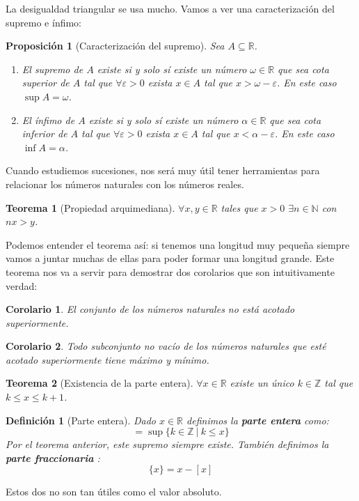 \documentclass{article}
\newtheorem{theorem}{Teorema}
\newtheorem{prop}{Proposición}
\newtheorem{cor}{Corolario}
\newtheorem{define}{Definición}
\begin{document}
La desigualdad triangular se usa mucho. Vamos a ver una caracterización del supremo e ínfimo:
\begin{prop}[Caracterización del supremo]
Sea $A\subseteq \mathbb{R}$.
\begin{enumerate}
\item
El supremo de $A$ existe si y solo sí existe un número $\omega \in \mathbb{R}$ que sea cota superior de $A$ tal que $\forall \varepsilon > 0$ exista $x \in A$ tal que $x > \omega - \varepsilon$. En este caso $\sup A = \omega$.

\item
El ínfimo de $A$ existe si y solo sí existe un número $\alpha \in \mathbb{R}$ que sea cota inferior de $A$ tal que $\forall \varepsilon > 0$ exista $x \in A$ tal que $x < \alpha - \varepsilon$. En este caso $\inf A = \alpha$.
\end{enumerate}
\end{prop}


Cuando estudiemos sucesiones, nos será muy útil tener herramientas para relacionar los números naturales con los números reales.


\begin{theorem}[Propiedad arquimediana]
$\forall x,y \in \mathbb{R}$ tales que $x>0$ $\exists n \in \mathbb{N}$ con $nx>y$.
\end{theorem}
Podemos entender el teorema así: si tenemos una longitud muy pequeña siempre vamos a juntar muchas de ellas para poder formar una longitud grande. Este teorema nos va a servir para demostrar dos corolarios que son intuitivamente verdad:
\begin{cor}
El conjunto de los números naturales no está acotado superiormente.
\end{cor}
\begin{cor}
Todo subconjunto no vacío de los números naturales que esté acotado superiormente tiene máximo y mínimo.
\end{cor}

\begin{theorem}[Existencia de la parte entera]
$\forall x \in \mathbb{R}$ existe un único $k \in \mathbb{Z}$ tal que $k\leq x\leq k+1$.
\end{theorem}
\begin{define}[Parte entera]
Dado $x \in \mathbb{R}$ definimos la \textbf{parte entera} como:
\begin{equation}
[x] = \sup \{k\in \mathbb{Z}\ |\ k\leq x\}
\end{equation}
Por el teorema anterior, este supremo siempre existe. También definimos la \textbf{parte fraccionaria} :
\begin{equation}
\{x\} = x - [x]
\end{equation}
\end{define}
Estos dos no son tan útiles como el valor absoluto.
\end{document}

